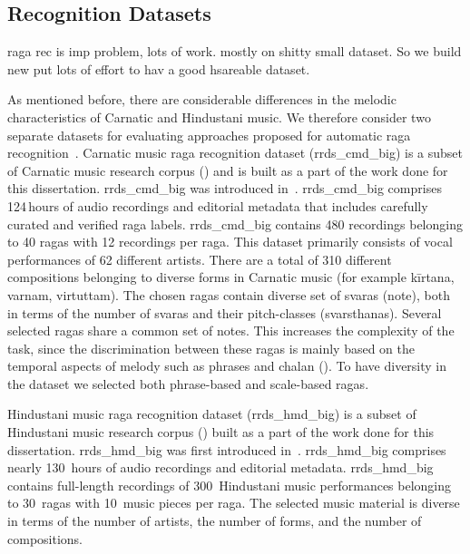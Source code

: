 {{{{\subsection{ Recognition Datasets}
\label{sec:corpus_raga_recognition_datasets}

raga rec is imp problem, lots of work. mostly on shitty small dataset. So we build new put lots of effort to hav a good hsareable dataset. 

As mentioned before, there are considerable differences in the melodic characteristics of Carnatic and Hindustani music. We therefore consider two separate datasets for evaluating approaches proposed for automatic \gls{raga} recognition~. Carnatic music \gls{raga} recognition dataset (\acrshort{rrds_cmd_big}) is a subset of Carnatic music research corpus () and is built as a part of the work done for this dissertation. \acrshort{rrds_cmd_big} was introduced in~\cite{gulatiphrase_2016}. \acrshort{rrds_cmd_big} comprises 124\,hours of audio recordings and editorial metadata that includes carefully curated and verified \gls{raga} labels. \acrshort{rrds_cmd_big} contains 480 recordings belonging to 40 \glspl{raga} with 12 recordings per \gls{raga}. This dataset primarily consists of vocal performances of 62 different artists. There are a total of 310 different compositions belonging to diverse forms in Carnatic music (for example k\={i}rtana, varnam, virtuttam). The chosen \glspl{raga} contain diverse set of \glspl{svara} (note), both in terms of the number of \glspl{svara} and their pitch-classes (\glspl{svarsthana}). Several selected \glspl{raga} share a common set of notes. This increases the complexity of the task, since the discrimination between these \glspl{raga} is mainly based on the temporal aspects of melody such as phrases and \gls{chalan} (). To have diversity in the dataset we selected both phrase-based and scale-based \glspl{raga}.%

Hindustani music \gls{raga} recognition dataset (\acrshort{rrds_hmd_big}) is a subset of Hindustani music research corpus () built as a part of the work done for this dissertation. \acrshort{rrds_hmd_big} was first introduced in~\cite{gulati_tdms_2016}. \acrshort{rrds_hmd_big} comprises nearly 130\, hours of audio recordings and editorial metadata. \acrshort{rrds_hmd_big} contains full-length recordings of 300~Hindustani music performances belonging to 30~\glspl{raga} with 10~music pieces per \gls{raga}. The selected music material is diverse in terms of the number of artists, the number of forms, and the number of compositions. 

}}}}
